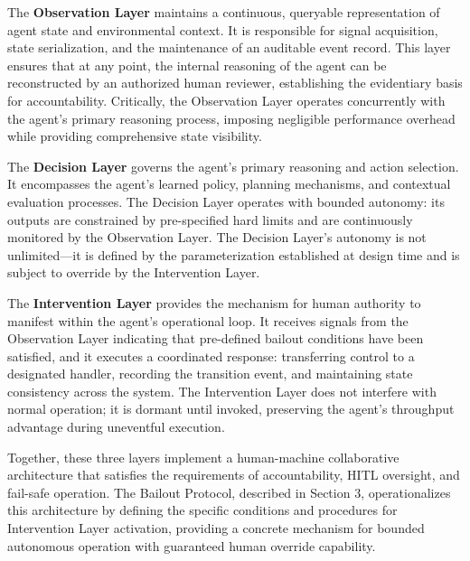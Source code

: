 The \textbf{Observation Layer} maintains a continuous, queryable representation of agent state and environmental context. It is responsible for signal acquisition, state serialization, and the maintenance of an auditable event record. This layer ensures that at any point, the internal reasoning of the agent can be reconstructed by an authorized human reviewer, establishing the evidentiary basis for accountability. Critically, the Observation Layer operates concurrently with the agent's primary reasoning process, imposing negligible performance overhead while providing comprehensive state visibility.

The \textbf{Decision Layer} governs the agent's primary reasoning and action selection. It encompasses the agent's learned policy, planning mechanisms, and contextual evaluation processes. The Decision Layer operates with bounded autonomy: its outputs are constrained by pre-specified hard limits and are continuously monitored by the Observation Layer. The Decision Layer's autonomy is not unlimited—it is defined by the parameterization established at design time and is subject to override by the Intervention Layer.

The \textbf{Intervention Layer} provides the mechanism for human authority to manifest within the agent's operational loop. It receives signals from the Observation Layer indicating that pre-defined bailout conditions have been satisfied, and it executes a coordinated response: transferring control to a designated handler, recording the transition event, and maintaining state consistency across the system. The Intervention Layer does not interfere with normal operation; it is dormant until invoked, preserving the agent's throughput advantage during uneventful execution.

Together, these three layers implement a human-machine collaborative architecture that satisfies the requirements of accountability, HITL oversight, and fail-safe operation. The Bailout Protocol, described in Section 3, operationalizes this architecture by defining the specific conditions and procedures for Intervention Layer activation, providing a concrete mechanism for bounded autonomous operation with guaranteed human override capability.